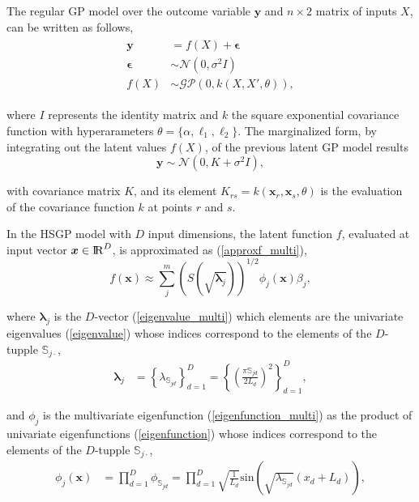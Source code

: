 \documentclass[]{interact}
\theoremstyle{plain}%
\theoremstyle{definition}
\theoremstyle{remark}
\begin{document}
The regular GP model over the outcome variable $\bm{y}$ and $n \times 2$ matrix of inputs $X$, can be written as follows,
%
\begin{eqnarray*}\label{eq:latentgp_simudata2}
\begin{split}
\bm{y} &= f(X) + \bm{\epsilon} \\
\bm{\epsilon} &\sim \mathcal{N}(0, \sigma^2  I) \\
f(X) &\sim \mathcal{GP}(0, k(X, X', \theta)),
\end{split}
\end{eqnarray*}

\noindent where $I$ represents the identity matrix and $k$ the square exponential covariance function with hyperarameters $\theta=\{\alpha,\ell_1,\ell_2\}$. The marginalized form, by integrating out the latent values $f(X)$, of the previous latent GP model results 
%
\begin{equation*}\label{eq:marginalizedgp_simudata2}
\bm{y} \sim \mathcal{N}(0, K + \sigma^2 I ),
\end{equation*}

\noindent with covariance matrix $K$, and its element $K_{rs}=k(\bm{x}_r,\bm{x}_s,\theta)$ is the evaluation of the covariance function $k$ at points $r$ and $s$.

In the HSGP model with $D$ input dimensions, the latent function $f$, evaluated at input vector $\bm{x} \in {\rm I\!R}^D$, is approximated as (\ref{approxf_multi}),
%
\begin{equation*}
f(\bm{x}) \approx \sum_{j}^m \left( S(\sqrt{\bm{\lambda}_j})\right)^{1/2} \phi_j(\bm{x}) \beta_j,
\end{equation*}

\noindent where $\bm{\lambda}_j$ is the $D$-vector (\ref{eigenvalue_multi}) which elements are the univariate eigenvalues (\ref{eigenvalue}) whose indices correspond to the elements of the $D$-tupple $\mathbb{S}_{j\cdotp}$,
%
\begin{align*}
\bm{\lambda}_j &= \left\{ \lambda_{\mathbb{S}_{jd}} \right\}_{d=1}^{D} = \left\{ \left(\tfrac{\pi \mathbb{S}_{jd}}{2L_d}\right)^2 \right\}_{d=1}^{D},
\end{align*}

\noindent and $\phi_j$ is the multivariate eigenfunction (\ref{eigenfunction_multi}) as the product of univariate eigenfunctions (\ref{eigenfunction}) whose indices correspond to the elements of the $D$-tupple $\mathbb{S}_{j\cdotp}$,
%
\begin{align*}
\phi_j(\bm{x}) &= \prod_{d=1}^{D} \phi_{\mathbb{S}_{jd}} = \prod_{d=1}^{D} \sqrt{\frac{1}{L_d}} \text{sin}\left(\sqrt{\lambda_{\mathbb{S}_{jd}}}(x_d+L_d)\right),
\end{align*}
\end{document}
